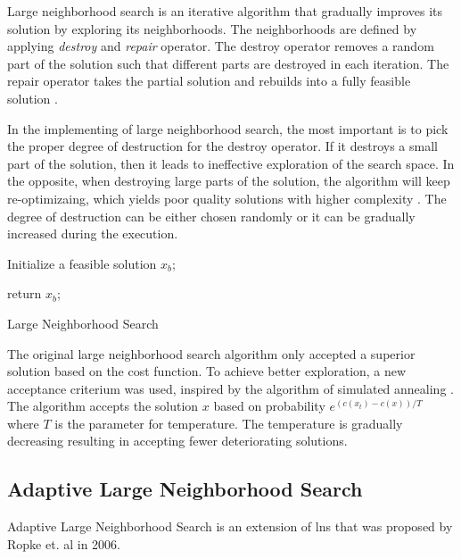 Large neighborhood search is an iterative algorithm that gradually improves its solution by exploring its neighborhoods. The neighborhoods are defined by applying \emph{destroy} and \emph{repair} operator. The destroy operator removes a random part of the solution such that different parts are destroyed in each iteration. The repair operator takes the partial solution and rebuilds into a fully feasible solution \cite{lns}.

In the implementing of large neighborhood search, the most important is to pick the proper degree of destruction for the destroy operator. If it destroys a small part of the solution, then it leads to ineffective exploration of the search space. In the opposite, when destroying large parts of the solution, the algorithm will keep re-optimizaing, which yields poor quality solutions with higher complexity \cite{lns}. The degree of destruction can be either chosen randomly or it can be gradually increased during the execution.\newline

\begin{algorithm}[H]
    \SetAlgoLined
    Initialize a feasible solution $x_b$;
    
        return $x_b$;
    \caption{Large Neighborhood Search}
\end{algorithm}

The original large neighborhood search algorithm only accepted a superior solution based on the cost function. To achieve better exploration, a new acceptance criterium was used, inspired by the algorithm of simulated annealing \cite{lns-anneling}. The algorithm accepts the solution $x$ based on probability $e^{(c(x_t) - c(x))/T}$ where $T$ is the parameter for temperature. The temperature is gradually decreasing resulting in accepting fewer deteriorating solutions.

\subsection{Adaptive Large Neighborhood Search}
Adaptive Large Neighborhood Search is an extension of \gls{lns} that was proposed by Ropke et. al \cite{alns} in 2006.

